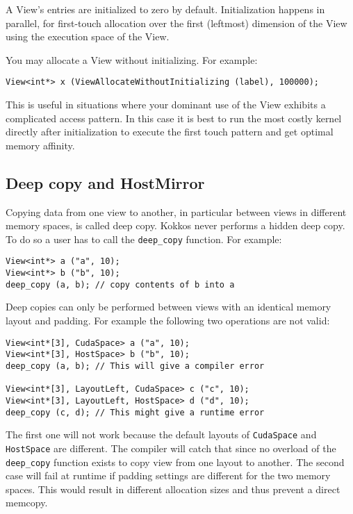 A View's entries are initialized to zero by default.  Initialization
happens in parallel, for first-touch allocation over the first
(leftmost) dimension of the View using the execution space
of the View. 

You may allocate a View without initializing.  For example:
\begin{lstlisting}
View<int*> x (ViewAllocateWithoutInitializing (label), 100000);
\end{lstlisting}
This is useful in situations where your dominant use of the View
exhibits a complicated access pattern. In this case it is best
to run the most costly kernel directly after initialization to 
execute the first touch pattern and get optimal memory affinity.

\subsection{Deep copy and HostMirror}

Copying data from one view to another, in particular between views 
in different memory spaces, is called deep copy. 
Kokkos never performs a hidden deep copy. To do so a user has to 
call the \lstinline!deep_copy! function.  For example:
\begin{lstlisting}
View<int*> a ("a", 10);
View<int*> b ("b", 10);
deep_copy (a, b); // copy contents of b into a
\end{lstlisting}

Deep copies can only be performed between views with an identical 
memory layout and padding. For example the following two operations
are not valid:
\begin{lstlisting}
View<int*[3], CudaSpace> a ("a", 10);
View<int*[3], HostSpace> b ("b", 10);
deep_copy (a, b); // This will give a compiler error

View<int*[3], LayoutLeft, CudaSpace> c ("c", 10);
View<int*[3], LayoutLeft, HostSpace> d ("d", 10);
deep_copy (c, d); // This might give a runtime error
\end{lstlisting}

The first one will not work because the default layouts of \lstinline|CudaSpace|
and \lstinline|HostSpace| are different. The compiler will catch that since 
no overload of the \lstinline|deep_copy| function exists to copy view from
one layout to another. The second case will fail at runtime if padding settings
are different for the two memory spaces. This would result in different 
allocation sizes and thus prevent a direct memcopy. 

